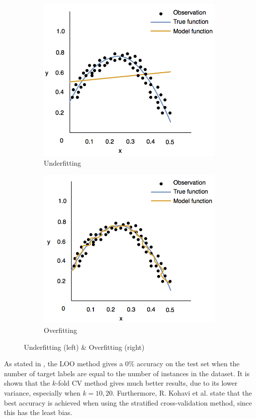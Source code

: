 \begin{figure}
\centering
\begin{subfigure}
  \centering
  \includegraphics[width=0.4\linewidth]{underfitting.png}
  \caption{Underfitting}
  \label{fig:underfitting}
\end{subfigure}
\begin{subfigure}
  \centering
  \includegraphics[width=.4\linewidth]{overfitting.png}
  \caption{Overfitting}
  \label{fig:overfitting}
\end{subfigure}
\caption{Underfitting (left) \& Overfitting (right)}
\label{fig:models}
\end{figure}

As stated in \cite{Kohavi1995study}, the LOO method gives a 0\% accuracy on the test set when the number of target labels are equal to the number of instances in the dataset. It is shown that the $k$-fold CV method gives much better results, due to its lower variance, especially when $k = {10, 20}$. Furthermore, R. Kohavi et al. state that the best accuracy is achieved when using the stratified cross-validation method, since this has the least bias.

